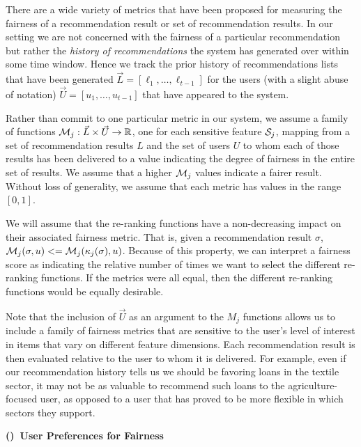 There are a wide variety of metrics that have been proposed for measuring the fairness of a recommendation result or set of recommendation results.  In our setting we are not concerned with the fairness of a particular recommendation but rather the \emph{history of recommendations} the system has generated over within some time window.  Hence we track the prior history of recommendations lists that have been generated $\vec{L} = [\ell_1, \ldots, \ell_{t-1}]$ for the users (with a slight abuse of notation) $\vec{U} = [u_1, \ldots, u_{t-1} ]$ that have appeared to the system.  

Rather than commit to one particular metric in our system, we assume a family of functions $\mathcal{M}_j: \vec{L} \times \vec{U} \rightarrow \mathbb{R}$, one for each sensitive feature $\mathcal{S}_j$, mapping from a set of recommendation results $L$ and the set of users $U$ to whom each of those results has been delivered to a value indicating the degree of fairness in the entire set of results. We assume that a higher $\mathcal{M}_j$ values indicate a fairer result. Without loss of generality, we assume that each metric has values in the range $[0,1]$.

We will assume that the re-ranking functions have a non-decreasing impact on their associated fairness metric. That is, given a recommendation result $\sigma$, $\mathcal{M}_j(\sigma, u) <=  \mathcal{M}_j(\kappa_j(\sigma), u)$.  Because of this property, we can interpret a fairness score as indicating the relative number of times we want to select the different re-ranking functions. If the metrics were all equal, then the different re-ranking functions would be equally desirable.

Note that the inclusion of $\vec{U}$ as an argument to the $M_j$ functions allows us to include a family of fairness metrics that are sensitive to the user's level of interest in items that vary on different feature dimensions. Each recommendation result is then evaluated relative to the user to whom it is delivered. For example, even if our recommendation history tells us we should be favoring loans in the textile sector, it may not be as valuable to recommend such loans to the agriculture-focused user, as opposed to a user that has proved to be more flexible in which sectors they support.

\vspace{0.25cm}
\noindent \textbf{()~User Preferences for Fairness}
\vspace{0.25cm}

